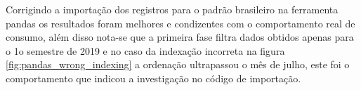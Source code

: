\documentclass[	12pt, Times, openright, twoside, a4paper, english, brazil]{abntex2}
\begin{document}
    	            \begin{figure}[htb]
                    \end{figure}

                    Corrigindo a importação dos registros para o padrão brasileiro na ferramenta pandas os resultados foram melhores e condizentes com o comportamento real de consumo, além disso nota-se que a primeira fase filtra dados obtidos apenas para o 1o semestre de 2019 e no caso da indexação incorreta na figura \ref{fig:pandas_wrong_indexing} a ordenação ultrapassou o mês de julho, este foi o comportamento que indicou a investigação no código de importação.
                    
                    \begin{figure}[htb]
                    \end{figure}
                    
\end{document}

